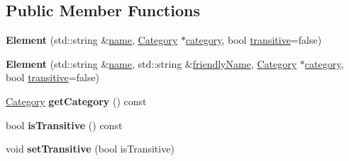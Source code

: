 \subsection*{\-Public \-Member \-Functions}
\begin{DoxyCompactItemize}
\item 
\hypertarget{class_element_a9215b851ecf46a90b0f1c2ff53a41539}{{\bfseries \-Element} (std\-::string \&\hyperlink{class_node_aa829edc37a2c92dacdab95bcef248175}{name}, \hyperlink{class_category}{\-Category} $\ast$\hyperlink{class_element_afa00dd000a5070957ea6d6035fb966bb}{category}, bool \hyperlink{class_element_aab52339b96c0a9ed05da28a26b5fb146}{transitive}=false)}\label{class_element_a9215b851ecf46a90b0f1c2ff53a41539}

\item 
\hypertarget{class_element_a3da28385c4f4cc48948464385cb911cc}{{\bfseries \-Element} (std\-::string \&\hyperlink{class_node_aa829edc37a2c92dacdab95bcef248175}{name}, std\-::string \&\hyperlink{class_node_a157acddebd6860eccdc8495039db161f}{friendly\-Name}, \hyperlink{class_category}{\-Category} $\ast$\hyperlink{class_element_afa00dd000a5070957ea6d6035fb966bb}{category}, bool \hyperlink{class_element_aab52339b96c0a9ed05da28a26b5fb146}{transitive}=false)}\label{class_element_a3da28385c4f4cc48948464385cb911cc}

\item 
\hypertarget{class_element_af84b1a37746d819c65e03c1d6e35b5f8}{\hyperlink{class_category}{\-Category} {\bfseries get\-Category} () const }\label{class_element_af84b1a37746d819c65e03c1d6e35b5f8}

\item 
\hypertarget{class_element_ac0c4de0334231c6d0772907fa6356d97}{bool {\bfseries is\-Transitive} () const }\label{class_element_ac0c4de0334231c6d0772907fa6356d97}

\item 
\hypertarget{class_element_a50a6c93072db6628d53d8f1b603ec10b}{void {\bfseries set\-Transitive} (bool is\-Transitive)}\label{class_element_a50a6c93072db6628d53d8f1b603ec10b}

\end{DoxyCompactItemize}
